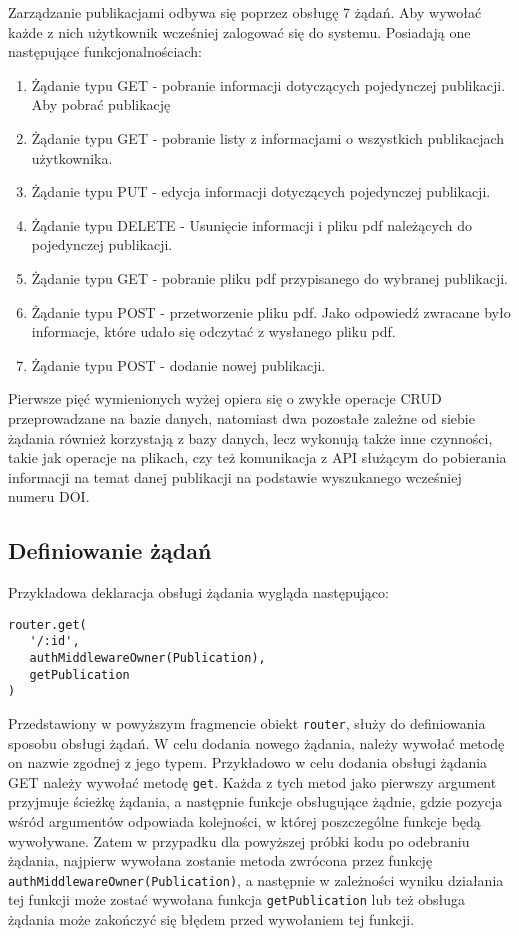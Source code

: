 \documentclass[a4paper,12pt,twoside,openany]{report}
\begin{document}
Zarządzanie publikacjami odbywa się poprzez obsługę 7 żądań. Aby wywołać każde z nich użytkownik wcześniej zalogować się do systemu. Posiadają one następujące funkcjonalnościach:
\begin{enumerate}
	
	\item Żądanie typu GET - pobranie informacji dotyczących pojedynczej publikacji. Aby pobrać publikację 
	
	\item Żądanie typu GET - pobranie listy z informacjami o wszystkich publikacjach użytkownika. 
		
	\item Żądanie typu PUT - edycja informacji dotyczących pojedynczej publikacji.
	
	\item Żądanie typu DELETE - Usunięcie informacji i pliku pdf należących do pojedynczej publikacji.
	
	\item Żądanie typu GET - pobranie pliku pdf przypisanego do wybranej publikacji.
	
	\item Żądanie typu POST - przetworzenie pliku pdf. Jako odpowiedź zwracane było informacje, które udało się odczytać z wysłanego pliku pdf.
	
	\item Żądanie typu POST - dodanie nowej publikacji.
\end{enumerate}

Pierwsze pięć wymienionych wyżej opiera się o zwykłe operacje CRUD przeprowadzane na bazie danych, natomiast dwa pozostałe zależne od siebie żądania również korzystają z bazy danych, lecz wykonują także inne czynności, takie jak operacje na plikach, czy też komunikacja z API służącym do pobierania informacji na temat danej publikacji na podstawie wyszukanego wcześniej numeru DOI.


\subsection{Definiowanie żądań}

Przykładowa deklaracja obsługi żądania wygląda następująco:
\begin{verbatim}
router.get(
   '/:id', 
   authMiddlewareOwner(Publication), 
   getPublication
)
\end{verbatim}
Przedstawiony w powyższym fragmencie obiekt \verb|router|, służy do definiowania sposobu obsługi żądań. W celu dodania nowego żądania, należy wywołać metodę on nazwie zgodnej z jego typem. Przykładowo w celu dodania obsługi żądania GET należy wywołać metodę \verb|get|. Każda z tych metod jako pierwszy argument przyjmuje ścieżkę żądania, a następnie funkcje obsługujące żądnie, gdzie pozycja wśród argumentów odpowiada kolejności, w której poszczególne funkcje będą wywoływane. Zatem w przypadku dla powyższej próbki kodu po odebraniu żądania, najpierw wywołana zostanie metoda zwrócona przez funkcję \verb|authMiddlewareOwner(Publication)|, a następnie w zależności wyniku działania tej funkcji może zostać wywołana funkcja \verb|getPublication| lub też obsługa żądania może zakończyć się błędem przed wywołaniem tej funkcji.
\end{document}
